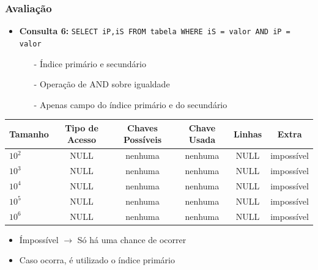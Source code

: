 \documentclass[10pt]{beamer}
\begin{document}
\begin{frame}[fragile]
  \frametitle{Avaliação}

    \begin{itemize}
      \item \textbf{Consulta 6: } \footnotesize{\texttt{SELECT iP,iS FROM tabela WHERE iS = valor AND iP = valor}}
      \begin{itemize}
        \item[-] Índice primário e secundário
        \item[-] Operação de AND sobre igualdade
        \item[-] Apenas campo do índice primário e do secundário
      \end{itemize}

    \end{itemize}

     \begin{table}[!htb]
    \footnotesize
    \centering
    \begin{tabular}{lccccc}
      \toprule
      \textbf{Tamanho} & \textbf{Tipo de Acesso}  & \textbf{Chaves Possíveis}  & \textbf{Chave Usada} & \textbf{Linhas} & \textbf{Extra}  \\
      \midrule
      $10^2$  & NULL  &  nenhuma  & nenhuma  & NULL  & impossível \\
      $10^3$  & NULL  &  nenhuma  & nenhuma  & NULL  & impossível \\
      $10^4$  & NULL  &  nenhuma  & nenhuma  & NULL  & impossível \\
      $10^5$  & NULL  &  nenhuma  & nenhuma  & NULL  & impossível \\
      $10^6$  & NULL  &  nenhuma  & nenhuma  & NULL  & impossível \\

      \bottomrule
    \end{tabular}
    \end{table}
   
    \begin{itemize}
    \item Ímpossível $\to$ Só há uma chance de ocorrer
    \item Caso ocorra, é utilizado o índice primário
    \end{itemize}


\end{frame}
\end{document}
